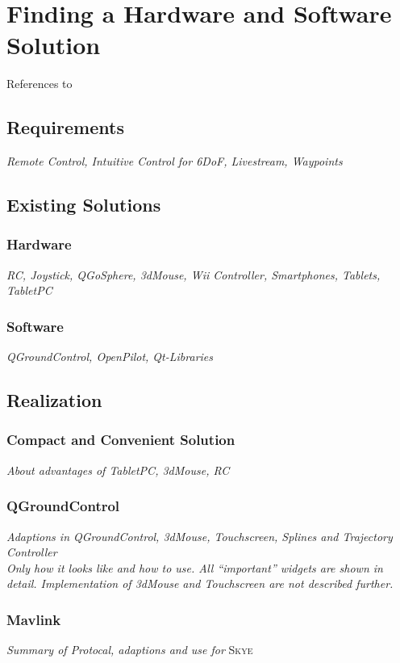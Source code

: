 \graphicspath{{graphics/HMI/}{graphics/control_modes/}}
\chapter{Finding a Hardware and Software Solution}
\label{cha:findHardSoftSolution}
References to \cite{kammermann}
\section{Requirements}
\label{sec:requirements}
\textit{Remote Control, Intuitive Control for 6DoF, Livestream, Waypoints}
\section{Existing Solutions}
\label{sec:existingSolutions}
\subsection{Hardware}
\textit{RC, Joystick, QGoSphere, 3dMouse, Wii Controller, Smartphones, Tablets, TabletPC}
\subsection{Software}
\textit{QGroundControl, OpenPilot, Qt-Libraries}
\section{Realization}
\label{sec:realization}
\subsection{Compact and Convenient Solution}
\textit{About advantages of TabletPC, 3dMouse, RC}
\subsection{QGroundControl}
\textit{Adaptions in QGroundControl, 3dMouse, Touchscreen, Splines and Trajectory Controller \\ Only how it looks like and how to use. All ``important'' widgets are shown in detail. Implementation of 3dMouse and Touchscreen are not described further.}
\subsection{Mavlink}
\textit{Summary of Protocal, adaptions and use for} \textsc{Skye}




